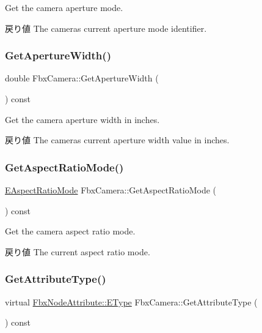 Get the camera aperture mode. \begin{DoxyReturn}{戻り値}
The camera\textquotesingle{}s current aperture mode identifier. 
\end{DoxyReturn}
\mbox{\label{class_fbx_camera_a7f9c7299e3a40cf708e97b13107396cc}} 
\subsubsection{\texorpdfstring{Get\+Aperture\+Width()}{GetApertureWidth()}}
{\footnotesize\ttfamily double Fbx\+Camera\+::\+Get\+Aperture\+Width (\begin{DoxyParamCaption}{ }\end{DoxyParamCaption}) const}

Get the camera aperture width in inches. \begin{DoxyReturn}{戻り値}
The camera\textquotesingle{}s current aperture width value in inches. 
\end{DoxyReturn}
\mbox{\label{class_fbx_camera_ad60e1323bdb9f349dbb96e5d8bdf716a}} 
\subsubsection{\texorpdfstring{Get\+Aspect\+Ratio\+Mode()}{GetAspectRatioMode()}}
{\footnotesize\ttfamily \hyperlink{class_fbx_camera_a2135478bb5fd6985835c14b11e1fccda}{E\+Aspect\+Ratio\+Mode} Fbx\+Camera\+::\+Get\+Aspect\+Ratio\+Mode (\begin{DoxyParamCaption}{ }\end{DoxyParamCaption}) const}

Get the camera aspect ratio mode. \begin{DoxyReturn}{戻り値}
The current aspect ratio mode. 
\end{DoxyReturn}
\mbox{\label{class_fbx_camera_a1149e4b05fd079637fe8d2a66a5a7a17}} 
\subsubsection{\texorpdfstring{Get\+Attribute\+Type()}{GetAttributeType()}}
{\footnotesize\ttfamily virtual \hyperlink{class_fbx_node_attribute_a08e1669d3d1a696910756ab17de56d6a}{Fbx\+Node\+Attribute\+::\+E\+Type} Fbx\+Camera\+::\+Get\+Attribute\+Type (\begin{DoxyParamCaption}{ }\end{DoxyParamCaption}) const\hspace{0.3cm}{\ttfamily [virtual]}}



